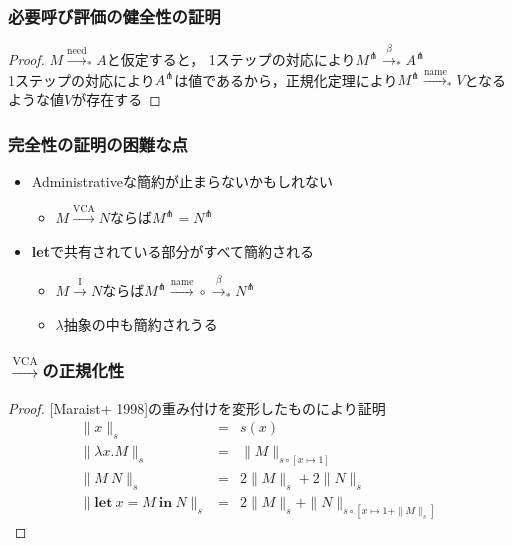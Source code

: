 \documentclass[dvipdfmx,cjk,xcolor=dvipsnames,envcountsect,notheorems,12pt]{beamer}
\theoremstyle{definition}
\newcommand{\LET}[3]{\mathbf{let}~#1=#2~\mathbf{in}~#3}
\newcommand{\EXPANDLET}[1]{#1^\pitchfork}
\newcommand{\SIZE}[2]{\parallel #1 \parallel_{#2}}
\newcommand{\FULLBETA}{\xrightarrow{\beta}}
\newcommand{\CALLBYNEED}{\xrightarrow{\mathrm{need}}}
\newcommand{\CALLBYNEEDI}{\xrightarrow{\mathrm{I}}}
\newcommand{\CALLBYNEEDVCA}{\xrightarrow{\mathrm{VCA}}}
\newcommand{\CALLBYNAME}{\xrightarrow{\mathrm{name}}}
\newcommand{\RTCLOS}[1]{#1_*}
\begin{document}
\begin{frame}
	\frametitle{必要呼び評価の健全性の証明}
	\begin{proof}
		\Large
		$M\RTCLOS{\CALLBYNEED}A$と仮定すると，
		1ステップの対応により$\EXPANDLET{M}\RTCLOS{\FULLBETA}\EXPANDLET{A}$\\
		\medskip
		1ステップの対応により$\EXPANDLET{A}$は値であるから，正規化定理により$\EXPANDLET{M}\RTCLOS{\CALLBYNAME}V$となるような値$V$が存在する
	\end{proof}
\end{frame}

\begin{frame}
	\frametitle{完全性の証明の困難な点}
	\begin{itemize}
		\item Administrativeな簡約が止まらないかもしれない
			\begin{itemize}
				\item $M\CALLBYNEEDVCA N$ならば$\EXPANDLET{M}=\EXPANDLET{N}$
			\end{itemize}
		\item \textbf{let}で共有されている部分がすべて簡約される
			\begin{itemize}
				\item $M\CALLBYNEEDI N$ならば$\EXPANDLET{M}{\CALLBYNAME}\circ{\RTCLOS{\FULLBETA}}\EXPANDLET{N}$
				\item $\lambda$抽象の中も簡約されうる
			\end{itemize}
	\end{itemize}
\end{frame}

\begin{frame}
	\frametitle{$\CALLBYNEEDVCA$の正規化性}
	\Large
	\begin{proof}
		{[Maraist+ 1998]}の重み付けを変形したものにより証明
		{\normalsize \[ \begin{array}{rcl}
		\SIZE{x}{s} & = & s(x) \\
		\SIZE{\lambda x. M}{s} & = & \SIZE{M}{s \circ [x \mapsto 1]} \\
		\SIZE{M~N}{s} & = & 2\SIZE{M}{s}+2\SIZE{N}{s} \\
		\SIZE{\LET{x}{M}{N}}{s} & = & 2\SIZE{M}{s}+\SIZE{N}{s \circ [x \mapsto 1+\SIZE{M}{s}]}
		\end{array} \]}
	\end{proof}
\end{frame}
\end{document}
